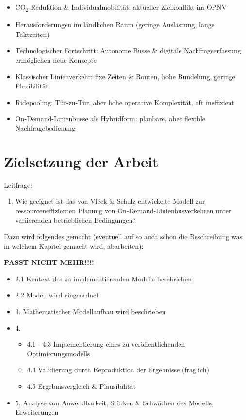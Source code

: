 \begin{itemize}
    \item CO\textsubscript{2}-Reduktion \& Individualmobilität: aktueller Zielkonflikt im ÖPNV
    \item Herausforderungen im ländlichen Raum (geringe Auslastung, lange Taktzeiten)
    \item Technologischer Fortschritt: Autonome Busse \& digitale Nachfrageerfassung ermöglichen neue Konzepte
    \item Klassischer Linienverkehr: fixe Zeiten \& Routen, hohe Bündelung, geringe Flexibilität
    \item Ridepooling: Tür-zu-Tür, aber hohe operative Komplexität, oft ineffizient
    \item On-Demand-Linienbusse als Hybridform: planbare, aber flexible Nachfragebedienung
\end{itemize}
\section{Zielsetzung der Arbeit}
\label{sec:1.2}
Leitfrage:
\begin{enumerate}
    \item Wie geeignet ist das von Vlćek \& Schulz entwickelte Modell zur ressourceneffizienten Planung von On-Demand-Linienbusverkehren unter variierenden betrieblichen Bedingungen?
\end{enumerate}
\vspace{1em}
Dazu wird folgendes gemacht (eventuell auf so auch schon die Beschreibung was in welchem Kapitel gemacht wird, abarbeiten):

\textbf{PASST NICHT MEHR!!!!}
\begin{itemize}
    \item 2.1 Kontext des zu implementierenden Modells beschrieben
    \item 2.2 Modell wird eingeordnet
    \item 3. Mathematischer Modellaufbau wird beschrieben
    \item 4. 
    \begin{itemize}
        \item 4.1 - 4.3 Implementierung eines zu veröffentlichenden Optimierungsmodells
        \item 4.4 Validierung durch Reproduktion der Ergebnisse (fraglich)
        \item 4.5 Ergebnisvergleich \& Plausibilität
    \end{itemize} 
    \item 5. Analyse von Anwendbarkeit, Stärken \& Schwächen des Modells, Erweiterungen
\end{itemize}
